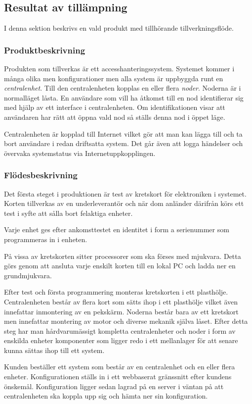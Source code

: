 \documentclass{article}
\begin{document}
\subsection*{Resultat av tillämpning}
I denna sektion beskrivs en vald produkt med tillhörande tillverkningsflöde.
\subsubsection*{Produktbeskrivning}
Produkten som tillverkas är ett accesshanteringssystem. Systemet kommer i många olika men konfigurationer men alla system är  uppbyggda runt en \emph{centralenhet}. Till den centralenheten kopplas en eller flera \emph{noder}. Noderna är i normalläget låsta. En användare som vill ha åtkomst till en nod identifierar sig med hjälp av ett interface i centralenheten. Om identifikationen visar att användaren har rätt att öppna vald nod så ställs denna nod i öppet läge.

Centralenheten är kopplad till Internet vilket gör att man kan lägga till och ta bort användare i redan driftsatta system. Det går även att logga händelser och övervaka systemstatus via Internetuppkopplingen.
\subsubsection*{Flödesbeskrivning}
Det första steget i produktionen är test av kretskort för elektroniken i systemet. Korten tillverkas av en underleverantör och när dom anländer därifrån körs ett test i syfte att sålla bort felaktiga enheter.

Varje enhet ges efter ankomsttestet en identitet i form a serienummer som programmeras in i enheten.

På vissa av kretskorten sitter processorer som ska förses med mjukvara. Detta görs genom att ansluta varje enskilt korten till en lokal PC och ladda ner en grundmjukvara. 
 
Efter test och första programmering monteras kretskorten i ett plasthölje. Centralenheten består av flera kort som sätts ihop i ett plasthölje vilket även innefattar inmontering av en pekskärm. Noderna består bara av ett kretskort men innefattar montering av motor och diverse mekanik själva låset. Efter detta steg har man hårdvarumässigt kompletta centralenheter och   noder i form av enskilda enheter komponenter som ligger redo i ett mellanlager för att senare kunna sättas ihop till ett system.

Kunden beställer ett system som består av en centralenhet och en eller flera enheter. Konfigurationen ställs in i ett webbaserat gränssnitt efter kundens önskemål. Konfiguration ligger sedan lagrad på en server i väntan på att centralenheten ska koppla upp sig och hämta ner sin konfiguration.
\end{document}
